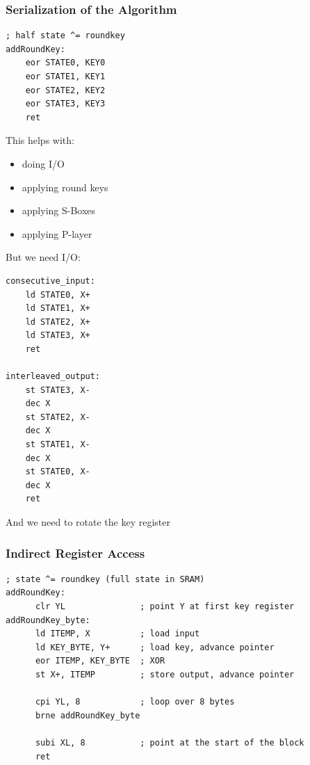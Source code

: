 \documentclass{beamer}
\begin{document}
\begin{frame}[fragile]
\frametitle{Serialization of the Algorithm}
\begin{minipage}[t]{0.48\textwidth}
\begin{lstlisting}
; half state ^= roundkey
addRoundKey:
    eor STATE0, KEY0
    eor STATE1, KEY1
    eor STATE2, KEY2
    eor STATE3, KEY3
    ret
\end{lstlisting}

This helps with:
\begin{itemize}
        \item doing I/O
        \item applying round keys
        \item applying S-Boxes
        \item applying P-layer
\end{itemize}
\end{minipage}
\hfill
\begin{minipage}[t]{0.48\textwidth}
But we need I/O:
\begin{lstlisting}
consecutive_input:
    ld STATE0, X+
    ld STATE1, X+
    ld STATE2, X+
    ld STATE3, X+
    ret

interleaved_output:
    st STATE3, X-
    dec X
    st STATE2, X-
    dec X
    st STATE1, X-
    dec X
    st STATE0, X-
    dec X
    ret
\end{lstlisting}
And we need to rotate the key register
\end{minipage}
\end{frame}

\begin{frame}[fragile]
\frametitle{Indirect Register Access}
\begin{lstlisting}
; state ^= roundkey (full state in SRAM)
addRoundKey:
      clr YL               ; point Y at first key register
addRoundKey_byte:
      ld ITEMP, X          ; load input
      ld KEY_BYTE, Y+      ; load key, advance pointer
      eor ITEMP, KEY_BYTE  ; XOR
      st X+, ITEMP         ; store output, advance pointer

      cpi YL, 8            ; loop over 8 bytes
      brne addRoundKey_byte

      subi XL, 8           ; point at the start of the block
      ret
\end{lstlisting}
\end{frame}
\end{document}
